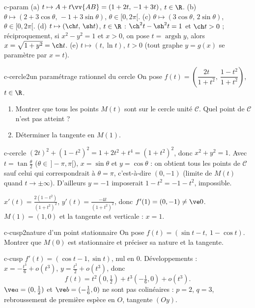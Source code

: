\begin{corrige}{c-param}
(a) $t\mapsto A+t\vv{AB}=(1+2t,\,-1+3t)$, $t\in\R$.
(b) $\theta\mapsto(2+3\cos\theta,\,-1+3\sin\theta)$, $\theta\in[0,2\pi[$.
(c) $\theta\mapsto(3\cos\theta,\,2\sin\theta)$, $\theta\in[0,2\pi[$.
(d) $t\mapsto(\ch t,\,\sh t)$, $t\in\R$ : $\ch^2t-\sh^2t=1$ et $\ch t>0$ ; réciproquement, si $x^2-y^2=1$ et $x>0$, on pose $t=\operatorname{argsh}y$, alors $x=\sqrt{1+y^2}=\ch t$.
(e) $t\mapsto(t,\ln t)$, $t>0$ (tout graphe $y=g(x)$ se paramètre par $x=t$).
\end{corrige}

\begin{exo}{c-cercle}{2}{un paramétrage rationnel du cercle}
On pose $f(t)=\left(\dfrac{2t}{1+t^2},\ \dfrac{1-t^2}{1+t^2}\right)$, $t\in\R$.
\begin{enumerate}
\item Montrer que tous les points $M(t)$ sont sur le cercle unité $\mathcal C$. Quel point de $\mathcal C$ n'est pas atteint ?
\item Déterminer la tangente en $M(1)$.
\end{enumerate}
\end{exo}

\begin{corrige}{c-cercle}
 $(2t)^2+(1-t^2)^2=1+2t^2+t^4=(1+t^2)^2$, donc $x^2+y^2=1$. Avec $t=\tan\frac\theta2$ ($\theta\in\,]-\pi,\pi[$), $x=\sin\theta$ et $y=\cos\theta$ : on obtient tous les points de $\mathcal C$ sauf celui qui correspondrait à $\theta=\pi$, c'est-à-dire $(0,-1)$ (limite de $M(t)$ quand $t\to\pm\infty$). D'ailleurs $y=-1$ imposerait $1-t^2=-1-t^2$, impossible.

 $x'(t)=\frac{2(1-t^2)}{(1+t^2)^2}$, $y'(t)=\frac{-4t}{(1+t^2)^2}$, donc $f'(1)=(0,-1)\neq\ve0$. $M(1)=(1,0)$ et la tangente est verticale : $x=1$.
\end{corrige}

\begin{exo}{c-cusp}{2}{nature d'un point stationnaire}
On pose $f(t)=(\sin t-t,\ 1-\cos t)$. Montrer que $M(0)$ est stationnaire et préciser sa nature et la tangente.
\end{exo}

\begin{corrige}{c-cusp}
$f'(t)=(\cos t-1,\sin t)$, nul en $0$. Développements : $x=-\frac{t^3}6+o(t^3)$, $y=\frac{t^2}2+o(t^3)$, donc
\[f(t)=t^2\left(0,\tfrac12\right)+t^3\left(-\tfrac16,0\right)+o(t^3).\]
$\ve a=(0,\frac12)$ et $\ve b=(-\frac16,0)$ ne sont pas colinéaires : $p=2$, $q=3$, rebroussement de première espèce en $O$, tangente $(Oy)$.
\end{corrige}

